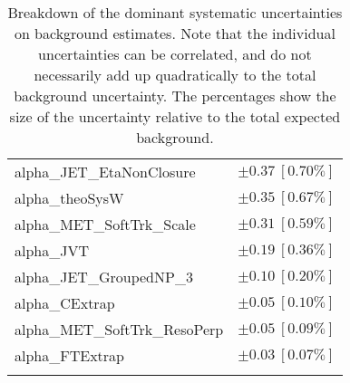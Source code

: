 \begin{table}
\begin{center}
\begin{tabular*}{\textwidth}{@{\extracolsep{\fill}}lc}
alpha\_JET\_EtaNonClosure         & $\pm 0.37\ [0.70\%] $       \\
alpha\_theoSysW         & $\pm 0.35\ [0.67\%] $       \\
alpha\_MET\_SoftTrk\_Scale         & $\pm 0.31\ [0.59\%] $       \\
alpha\_JVT         & $\pm 0.19\ [0.36\%] $       \\
alpha\_JET\_GroupedNP\_3         & $\pm 0.10\ [0.20\%] $       \\
alpha\_CExtrap         & $\pm 0.05\ [0.10\%] $       \\
alpha\_MET\_SoftTrk\_ResoPerp         & $\pm 0.05\ [0.09\%] $       \\
alpha\_FTExtrap         & $\pm 0.03\ [0.07\%] $       \\
\noalign{\smallskip}\hline\noalign{\smallskip}
\end{tabular*}
\end{center}
\caption[Breakdown of uncertainty on background estimates]{
Breakdown of the dominant systematic uncertainties on background estimates.
Note that the individual uncertainties can be correlated, and do not necessarily add up quadratically to 
the total background uncertainty. The percentages show the size of the uncertainty relative to the total expected background.
\label{table.results.bkgestimate.uncertainties.SRB_TW}}
\end{table}
%